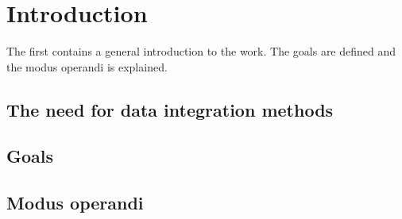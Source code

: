 \chapter{Introduction}
\label{cha:intro}
The first contains a general introduction to the work. The goals are
defined and the modus operandi is explained.

\section{The need for data integration methods}

\section{Goals}

\section{Modus operandi}

